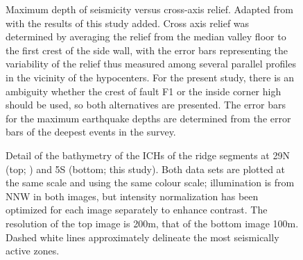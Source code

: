 \documentclass[jgr]{aguplus}
\begin{document}
\begin{figure}

\caption{Maximum depth of seismicity versus cross-axis relief. Adapted from
  \protect\citet{barclay01} with the results of this study added.
Cross axis relief was determined by averaging the relief from the median valley
floor to the first crest of the side wall, with the error bars representing the
variability of the relief thus measured among several parallel profiles in the
vicinity of the hypocenters.  For the present study, there is an
ambiguity whether the crest of fault F1 or the inside corner high should be used,
so both alternatives are presented.  The error bars for the maximum earthquake depths
are determined from the error bars of the deepest events in the survey.}
\label{fig:maxdep-topo}
\end{figure}

\begin{figure}
\caption{Detail of the bathymetry of the ICHs of the ridge segments at
29\dg N (top; \citet{wolfe95}) and 5\dg S (bottom; this study).  Both
data sets are plotted at the same scale and using the same colour
scale; illumination is from NNW in both images, but intensity
normalization  has been optimized for each image separately to enhance contrast.  The resolution of the top image is 200m, that of
the bottom image 100m.
Dashed white
lines approximately delineate the most seismically active zones.}
\label{fig:topo-cmp}
\end{figure}


\setcounter{figure}{0}
\renewcommand{\thefigure}{A\arabic{figure}}

\setcounter{table}{0}
\renewcommand{\thetable}{A\arabic{table}}


\clearpage

%

\begin{table}
%
\label{tbl:stations}
\end{table}


\clearpage
\end{document}
